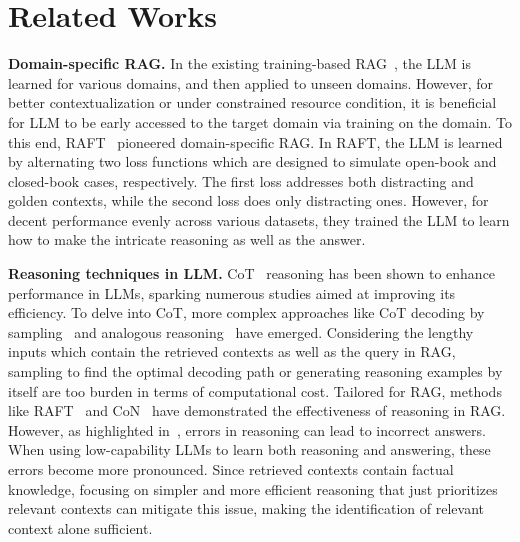\section{Related Works}
\vspace{-0.2cm}
\noindent \textbf{Domain-specific RAG.}
In the existing training-based RAG~\cite{linra,wanginstructretro,asai2023self}, the LLM is learned for various domains, and then applied to unseen domains. However, for better contextualization or under constrained resource condition, it is beneficial for LLM to be early accessed to the target domain via training on the domain. To this end, RAFT~\cite{RAFT} pioneered domain-specific RAG. In RAFT, the LLM is learned by alternating two loss functions which are designed to simulate open-book and closed-book cases, respectively. The first loss addresses both distracting and golden contexts, while the second loss does only distracting ones. However, for decent performance evenly across various datasets, they trained the LLM to learn how to make the intricate reasoning as well as the answer.  

\noindent \textbf{Reasoning techniques in LLM.}
CoT~\cite{wei2022chain} reasoning has been shown to enhance performance in LLMs, sparking numerous studies aimed at improving its efficiency. To delve into CoT, more complex approaches like CoT decoding by sampling~\cite{wang2022self,wang2024chain} and analogous reasoning~\cite{yasunaga2023large} have emerged. Considering the lengthy inputs which contain the retrieved contexts as well as the query in RAG, sampling to find the optimal decoding path or generating reasoning examples by itself are too burden in terms of computational cost. Tailored for RAG, methods like RAFT~\cite{RAFT} and CoN~\cite{con} have demonstrated the effectiveness of reasoning in RAG. However, as highlighted in~\cite{shi2023large}, errors in reasoning can lead to incorrect answers. When using low-capability LLMs to learn both reasoning and answering, these errors become more pronounced. Since retrieved contexts contain factual knowledge, focusing on simpler and more efficient reasoning that just prioritizes relevant contexts can mitigate this issue, making the identification of relevant context alone sufficient.

